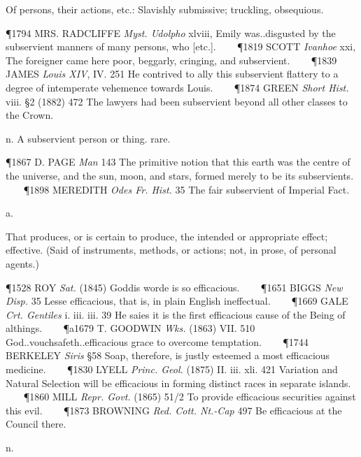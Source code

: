 \begin{description}[wide, labelwidth=!, labelindent=0pt]
\begin{myenumerate}
 Of persons, their actions, etc.: Slavishly submissive; truckling, obsequious.

\P 1794 MRS. RADCLIFFE  \textit{Myst. Udolpho} xlviii, Emily was..disgusted by the subservient manners of many persons, who [etc.].    
\P 1819 SCOTT  \textit{Ivanhoe} xxi, The foreigner came here poor, beggarly, cringing, and subservient.    
\P 1839 JAMES  \textit{Louis XIV}, IV. 251 He contrived to ally this subservient flattery to a degree of intemperate vehemence towards Louis.    
\P 1874 GREEN  \textit{Short Hist.} viii. §2 (1882) 472 The lawyers had been subservient beyond all other classes to the Crown.

 n. A subservient person or thing. rare.

\P 1867 D. PAGE  \textit{Man} 143 The primitive notion that this earth was the centre of the universe, and the sun, moon, and stars, formed merely to be its subservients.    
\P 1898 MEREDITH  \textit{Odes Fr. Hist.} 35 The fair subservient of Imperial Fact.
\end{myenumerate}


 a.

\noindent {}

\vspace{-0.3cm}

That produces, or is certain to produce, the intended or appropriate effect; effective. (Said of instruments, methods, or actions; not, in prose, of personal agents.)

\P 1528 ROY  \textit{Sat.} (1845) Goddis worde is so efficacious.    
\P 1651 BIGGS  \textit{New Disp.} 35 Lesse efficacious, that is, in plain English ineffectual.    
\P 1669 GALE  \textit{Crt. Gentiles} i. iii. iii. 39 He saies it is the first efficacious cause of the Being of althings.    
\P a1679 T. GOODWIN  \textit{Wks.} (1863) VII. 510 God..vouchsafeth..efficacious grace to overcome temptation.    
\P 1744 BERKELEY  \textit{Siris} §58 Soap, therefore, is justly esteemed a most efficacious medicine.    
\P 1830 LYELL  \textit{Princ. Geol.} (1875) II. iii. xli. 421 Variation and Natural Selection will be efficacious in forming distinct races in separate islands.    
\P 1860 MILL  \textit{Repr. Govt.} (1865) 51/2 To provide efficacious securities against this evil.    
\P 1873 BROWNING  \textit{Red. Cott. Nt.-Cap} 497 Be efficacious at the Council there.


 n.


\end{description}
